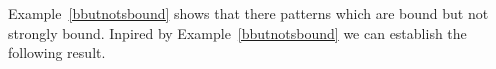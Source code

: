 Example~\ref{bbutnotsbound} shows that there patterns 
which are bound but not strongly bound. Inpired by Example~\ref{bbutnotsbound}
we can establish the following result.

